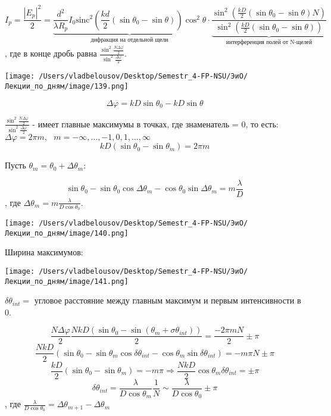 \documentclass[12pt, a4paper]{report}
\begin{document}
\[ I_p = \frac{\left\lvert  E_p \right\rvert ^2 }{2 } = \underbrace{\frac{d ^2 }{\lambda R_p } I_0 \mathrm{sinc } ^2 \left( \frac{kd}{2 } (\sin \theta_0 - \sin \theta) \right) \cos ^2 \theta}_{\text{дифракция на отдельной щели} } \cdot  \underbrace{\frac{\sin ^2 \displaystyle  \left(  \frac{kD}{2 } (\sin \theta_0 - \sin \theta) N \right)}{\sin  ^2 \displaystyle  \left( \frac{kD}{2 } (\sin \theta_0 - \sin \theta)  \right)}  }_{\text{интерференция полей от N-щелей} }   \] 
, где в конце дробь равна \( \frac{ \displaystyle  \sin  ^2 \frac{N \Delta \varphi }{2} }{\displaystyle \sin  ^2 \frac{ \Delta \varphi }{2} }  \). 

\begin{center}
    \texttt{[image: /Users/vladbelousov/Desktop/Semestr\_4-FP-NSU/ЭиО/Лекции\_по\_дням/image/139.png]}
\end{center}
\[ \Delta \varphi = kD \sin \theta_0 - k D \sin  \theta \] 

\( \displaystyle   \frac{ \displaystyle  \sin  ^2 \frac{N \Delta \varphi }{2} }{\displaystyle \sin  ^2 \frac{ \Delta \varphi }{2} } \) - имеет главные максимумы в точках, где знаменатель = 0, то есть: \( \Delta \varphi = 2 \pi m , \text{ }  m = - \infty, \ldots, -1,0,1, \ldots, \infty  \) 
\[ kD (\sin \theta_0 - \sin  \theta_m ) = 2\pi m  \] 

Пусть \( \theta_m = \theta_0 + \Delta \theta_m : \) 

\[ \sin \theta_0 - \sin \theta_0 \cos  \Delta \theta_m - \cos \theta_0 \sin \Delta \theta_m = m \frac{\lambda}{D}  \] 
, где \( \displaystyle  \Delta \theta_m = m \frac{\lambda}{ D \cos \theta_0}  \). 

\begin{center}
    \texttt{[image: /Users/vladbelousov/Desktop/Semestr\_4-FP-NSU/ЭиО/Лекции\_по\_дням/image/140.png]}
\end{center}

Ширина максимумов: 

\begin{center}
    \texttt{[image: /Users/vladbelousov/Desktop/Semestr\_4-FP-NSU/ЭиО/Лекции\_по\_дням/image/141.png]}
\end{center}

\( \delta \theta_{int } =   \)  угловое расстояние между главным максимум  и первым  интенсивности в 0. 

\[ \frac{N \Delta \varphi }{2 } \frac{N k D (\sin  \theta_0 - \sin (\theta_m + \sigma \theta_{ int } ))}{2 } = \frac{ - 2 \pi m N }{2 } \pm  \pi    \] 
\[ \frac{ N k D }{2 } ( \sin  \theta_0 - \sin  \theta_m \cos  \delta \theta_{ int }  - \cos  \theta_m  \sin \delta \theta_{ int }  ) = - m \pi N \pm  \pi  \] 
\[  \frac{k D }{2 } (\sin  \theta_0 - \sin \theta_m) = - m \pi \Rightarrow \frac{N k D }{2 }  \cos \theta_m \delta \theta_{ int }  = \pm  \pi\] 
\[ \delta \theta_{ int }  = \frac{\lambda}{D \cos  \theta_m }\frac{1}{N  }  \sim \frac{\lambda}{D \cos \theta_0 } \pm  \pi   \] 
, где \( \displaystyle  \frac{\lambda}{D \cos \theta_0} = \Delta \theta_{m + 1 }  - \Delta \theta_m  \) \\
\end{document}

